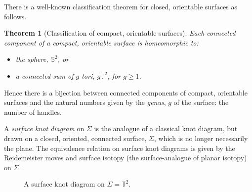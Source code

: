 \documentclass[12pt]{report}
\newcommand{\T}{\mathbb{T}}
\renewcommand{\S}{\mathbb{S}}
\newtheorem*{theorem}{Theorem}
\begin{document}
There is a well-known classification theorem for closed, orientable surfaces as follows.

\begin{theorem}[Classification of compact, orientable surfaces]
Each connected component of a compact, orientable surface is homeomorphic to:
\begin{itemize}
	\item the sphere, $\S^{2}$, or
	\item a connected sum of $g$ tori, $g\T^{2}$, for $g \geq 1$.
\end{itemize}
\end{theorem}
Hence there is a bijection between connected components of compact, orientable surfaces and the natural numbers given by the \textit{genus}, $g$ of the surface: the number of handles.

A \textit{surface knot diagram} on $\Sigma$ is the analogue of a classical knot diagram, but drawn on a closed, oriented, connected surface, $\Sigma$, which is no longer necessarily the plane. The equivalence relation on surface knot diagrams is given by the Reidemeister moves and surface isotopy (the surface-analogue of planar isotopy) on $\Sigma$.

\begin{figure}[hbt!]
	\centering
	\def\svgscale{0.6}
	
	
	\caption{A surface knot diagram on $\Sigma = \T^{2}$.}
	\label{fig:surface-knot-diagram-example}
\end{figure}
\end{document}
